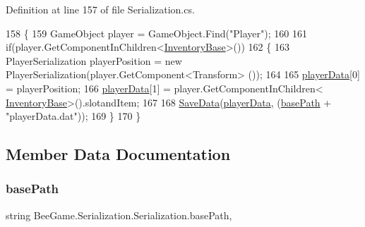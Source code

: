 Definition at line 157 of file Serialization.\+cs.


\begin{DoxyCode}
158         \{
159             GameObject player = GameObject.Find(\textcolor{stringliteral}{"Player"});
160 
161             \textcolor{keywordflow}{if}(player.GetComponentInChildren<\hyperlink{class_bee_game_1_1_inventory_1_1_inventory_base}{InventoryBase}>())
162             \{
163                 PlayerSerialization playerPosition = \textcolor{keyword}{new} PlayerSerialization(player.GetComponent<Transform>
      ());
164 
165                 \hyperlink{class_bee_game_1_1_serialization_1_1_serialization_a4c53353a34466434389b58c351edf08d}{playerData}[0] = playerPosition;
166                 \hyperlink{class_bee_game_1_1_serialization_1_1_serialization_a4c53353a34466434389b58c351edf08d}{playerData}[1] = player.GetComponentInChildren<
      \hyperlink{class_bee_game_1_1_inventory_1_1_inventory_base}{InventoryBase}>().slotandItem;
167 
168                 \hyperlink{class_bee_game_1_1_serialization_1_1_serialization_a5e84293340234b478d4ef6bd8168260f}{SaveData}(\hyperlink{class_bee_game_1_1_serialization_1_1_serialization_a4c53353a34466434389b58c351edf08d}{playerData}, (\hyperlink{class_bee_game_1_1_serialization_1_1_serialization_ab90922fcf58a723ce591487507356310}{basePath} + \textcolor{stringliteral}{"playerData.dat"}));
169             \}
170         \}
\end{DoxyCode}


\subsection{Member Data Documentation}
\mbox{\label{class_bee_game_1_1_serialization_1_1_serialization_ab90922fcf58a723ce591487507356310}} 
\subsubsection{\texorpdfstring{base\+Path}{basePath}}
{\footnotesize\ttfamily string Bee\+Game.\+Serialization.\+Serialization.\+base\+Path\hspace{0.3cm}{\ttfamily [static]}, {\ttfamily [private]}}



